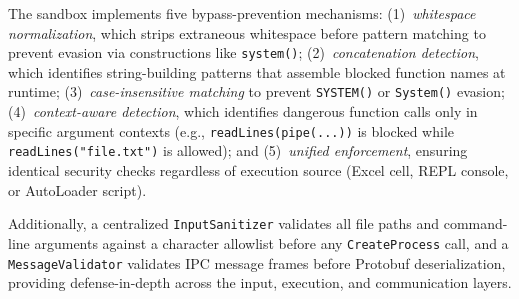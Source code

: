 \documentclass[preprint,12pt,authoryear]{elsarticle}
\begin{document}
\begin{table}[htbp]
\centering
\small
\caption{Security sandbox: blocked operation categories per language. Each category includes multiple specific patterns (30+ total per language).}
\label{tab:sandbox}
\end{table}

The sandbox implements five bypass-prevention mechanisms: (1)~\emph{whitespace normalization}, which strips extraneous whitespace before pattern matching to prevent evasion via constructions like \texttt{sys\allowbreak tem()}; (2)~\emph{concatenation detection}, which identifies string-building patterns that assemble blocked function names at runtime; (3)~\emph{case-insensitive matching} to prevent \texttt{SYSTEM()} or \texttt{System()} evasion; (4)~\emph{context-aware detection}, which identifies dangerous function calls only in specific argument contexts (e.g., \texttt{readLines(pipe(...))} is blocked while \texttt{readLines("file.txt")} is allowed); and (5)~\emph{unified enforcement}, ensuring identical security checks regardless of execution source (Excel cell, REPL console, or AutoLoader script).

Additionally, a centralized \texttt{InputSanitizer} validates all file paths and command-line arguments against a character allowlist before any \texttt{CreateProcess} call, and a \texttt{MessageValidator} validates IPC message frames before Protobuf deserialization, providing defense-in-depth across the input, execution, and communication layers.
\end{document}
